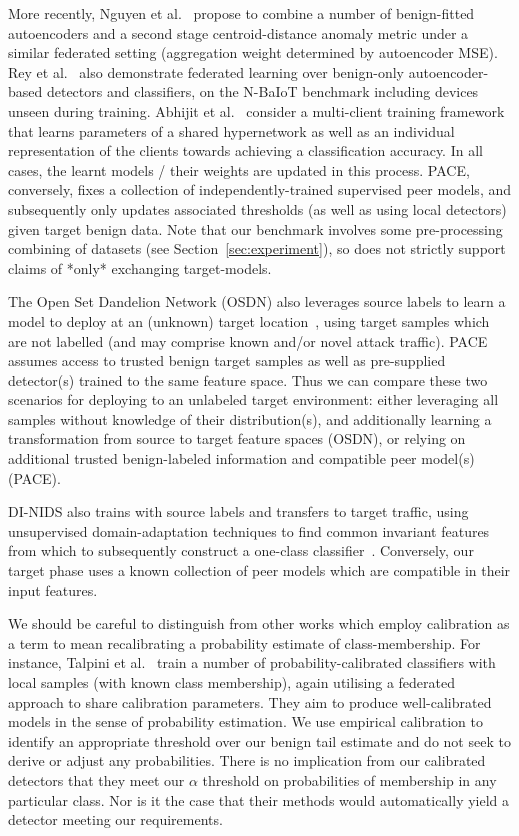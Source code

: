 More recently, Nguyen et al.~\cite{nguyen2025fedmse} propose to combine a number of benign-fitted autoencoders and a second stage centroid-distance anomaly metric under a similar federated setting (aggregation weight determined by autoencoder MSE). Rey et al.~\cite{rey2022federated} also demonstrate federated learning over benign-only autoencoder-based detectors and classifiers, on the N-BaIoT benchmark including devices unseen during training. Abhijit et al.~\cite{hyperids2025} consider a multi-client training framework that learns parameters of a shared hypernetwork as well as an individual representation of the clients towards achieving a classification accuracy. In all cases, the learnt models / their weights are updated in this process. PACE, conversely, fixes a collection of independently-trained supervised peer models, and subsequently only updates associated thresholds (as well as using local detectors) given target benign data. Note that our benchmark involves some pre-processing combining of datasets (see Section~\ref{sec:experiment}), so does not strictly support claims of *only* exchanging target-models.

The Open Set Dandelion Network (OSDN) also leverages source labels to learn a model to deploy at an (unknown) target location~\cite{osdn2024}, using target samples which are not labelled (and may comprise known and/or novel attack traffic). PACE assumes access to trusted benign target samples as well as pre-supplied detector(s) trained to the same feature space. Thus we can compare these two scenarios for deploying to an unlabeled target environment: either leveraging all samples without knowledge of their distribution(s), and additionally learning a transformation from source to target feature spaces (OSDN), or relying on additional trusted benign-labeled information and compatible peer model(s) (PACE).

DI-NIDS also trains with source labels and transfers to target traffic, using unsupervised domain-adaptation techniques to find common invariant features from which to subsequently construct a one-class classifier~\cite{layeghy2023dinids}. Conversely, our target phase uses a known collection of peer models which are compatible in their input features.

We should be careful to distinguish from other works which employ calibration as a term to mean recalibrating a probability estimate of class-membership. For instance, Talpini et al.~\cite{talpini2025} train a number of probability-calibrated classifiers with local samples (with known class membership), again utilising a federated approach to share calibration parameters. They aim to produce well-calibrated models in the sense of probability estimation. We use empirical calibration to identify an appropriate threshold over our benign tail estimate and do not seek to derive or adjust any probabilities. There is no implication from our calibrated detectors that they meet our $\alpha$ threshold on probabilities of membership in any particular class. Nor is it the case that their methods would automatically yield a detector meeting our requirements.

